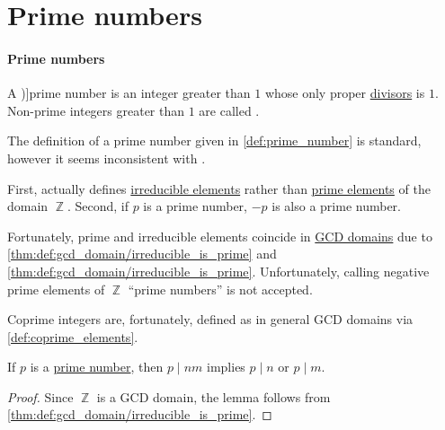 \section{Prime numbers}\label{sec:prime_numbers}

\paragraph{Prime numbers}

\begin{definition}\label{def:prime_number}
  A \term[ru=простое число (\cite[45]{Зорич2019АнализЧасть1})]{prime number} is an integer greater than \( 1 \) whose only  proper \hyperref[def:divisibility]{divisors} is \( 1 \). Non-prime integers greater than \( 1 \) are called .
\end{definition}

\begin{remark}\label{rem:prime_numbers_and_prime_elements}
  The definition of a prime number given in \cref{def:prime_number} is standard, however it seems inconsistent with .

  First,  actually defines \hyperref[def:domain_divisibility/irreducible]{irreducible elements} rather than \hyperref[def:domain_divisibility/prime]{prime elements} of the domain \( \BbbZ \). Second, if \( p \) is a prime number, \( -p \) is also a prime number.

  Fortunately, prime and irreducible elements coincide in \hyperref[def:gcd_domain]{GCD domains} due to \cref{thm:def:gcd_domain/irreducible_is_prime} and \cref{thm:def:gcd_domain/irreducible_is_prime}. Unfortunately, calling negative prime elements of \( \BbbZ \) \enquote{prime numbers} is not accepted.

  Coprime integers are, fortunately, defined as in general GCD domains via \cref{def:coprime_elements}.
\end{remark}

\begin{lemma}\label{thm:euclids_lemma}
  If \( p \) is a \hyperref[def:prime_number]{prime number}, then \( p \mid nm \) implies \( p \mid n \) or \( p \mid m \).
\end{lemma}
\begin{proof}
  Since \( \BbbZ \) is a GCD domain, the lemma follows from \cref{thm:def:gcd_domain/irreducible_is_prime}.
\end{proof}

